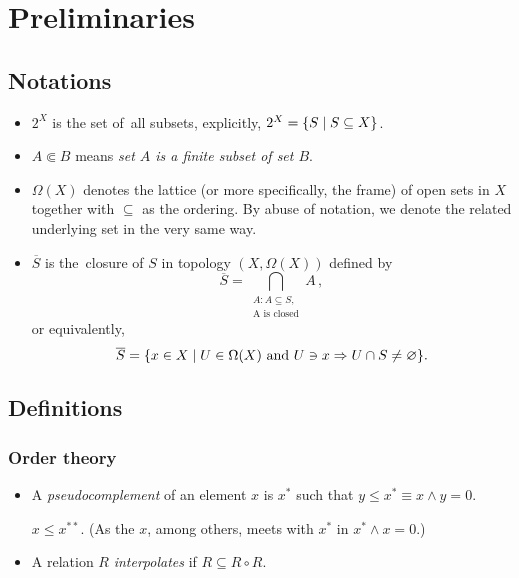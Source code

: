 \chapter*{Preliminaries}

\section*{Notations}

\begin{itemize}
\item $2^X$ is the set of~all subsets, explicitly, $2^X = \{ S \mid S\subseteq X
\}$.

\item $A \Subset B$ means {\sl set $A$ is a finite subset of set $B$\/}.

\item $\Omega(X)$ denotes the lattice (or more specifically, the frame) of open
sets in $X$ together with $\subseteq$ as the ordering. 
By abuse of notation, we denote the related underlying set in the very same
way.

\item $\overline{S}$ is the~closure of $S$ in topology $(X, \Omega(X))$ defined
by
\[
  \overline{S} = \bigcap_{ \substack{
    A: A\subseteq S, \\
   \text{A is closed}}}
   A \, ,
\]
or equivalently,
\[
  \overline{S} = \{ x \in X \mid U\in\Omega(X) \text{ and } U\owns x \Rightarrow
  U \cap S \ne \varnothing \}.
\]
\end{itemize}

\section*{Definitions}

\subsection*{Order theory}

\begin{itemize}
\item A \emph{pseudocomplement} of an element $x$ is $x^*$ such that $y \le x^*
\equiv x \wedge y = 0$.
  \begin{fact}
    $x \le x^{**}$.
    (As the $x$, among others, meets with $x^*$ in $x^* \wedge x = 0$.)
  \end{fact}

\item A relation $R$ \emph{interpolates} if $R \subseteq R \circ R$.
\end{itemize}

